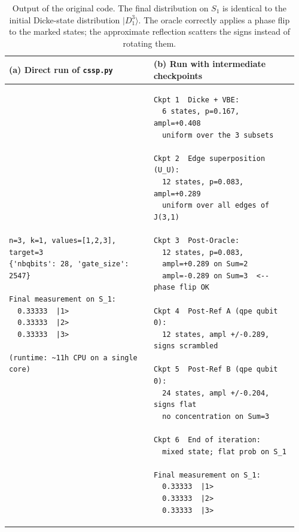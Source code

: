 \documentclass[11pt,a4paper]{article}
\begin{document}
\begin{table}[H] %
\centering
\footnotesize %
\begin{tabular}{@{}p{0.48\linewidth} p{0.48\linewidth}@{}}
\toprule
\textbf{(a) Direct run of \texttt{cssp.py}} & 
\textbf{(b) Run with intermediate checkpoints} \\
\midrule
\begin{minipage}[t]{\linewidth}
\begin{lstlisting}[style=plain, basicstyle=\ttfamily\scriptsize]
n=3, k=1, values=[1,2,3], target=3
{'nbqbits': 28, 'gate_size': 2547}

Final measurement on S_1:
  0.33333  |1>
  0.33333  |2>
  0.33333  |3>

(runtime: ~11h CPU on a single core)
\end{lstlisting}
\end{minipage}
& 
\begin{minipage}[t]{\linewidth}
\begin{lstlisting}[style=plain, basicstyle=\ttfamily\scriptsize]
Ckpt 1  Dicke + VBE:
  6 states, p=0.167, ampl=+0.408
  uniform over the 3 subsets

Ckpt 2  Edge superposition (U_U):
  12 states, p=0.083, ampl=+0.289
  uniform over all edges of J(3,1)

Ckpt 3  Post-Oracle:
  12 states, p=0.083,
  ampl=+0.289 on Sum=2
  ampl=-0.289 on Sum=3  <-- phase flip OK

Ckpt 4  Post-Ref A (qpe qubit 0):
  12 states, ampl +/-0.289, signs scrambled

Ckpt 5  Post-Ref B (qpe qubit 0):
  24 states, ampl +/-0.204, signs flat
  no concentration on Sum=3

Ckpt 6  End of iteration:
  mixed state; flat prob on S_1

Final measurement on S_1:
  0.33333  |1>
  0.33333  |2>
  0.33333  |3>
\end{lstlisting}
\end{minipage}\\
\bottomrule
\end{tabular}
\caption{Output of the original code. The final distribution on $S_1$ is identical to the initial Dicke-state distribution $|D^3_1\rangle$. The oracle correctly applies a phase flip to the marked states; the approximate reflection scatters the signs instead of rotating them.}
\label{tab:baseline}
\end{table}
\end{document}
